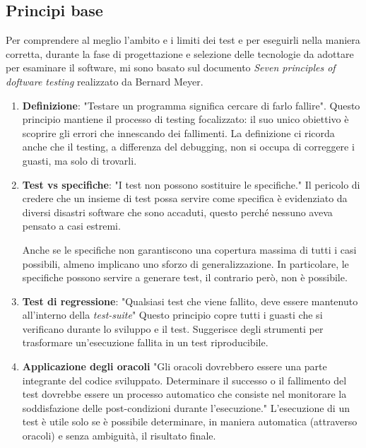\subsection{Principi base}

Per comprendere al meglio l'ambito e i limiti dei test e per eseguirli nella maniera corretta, durante la fase di progettazione e selezione delle tecnologie da adottare per esaminare il software, mi sono basato sul documento \textit{Seven principles of doftware testing} realizzato da Bernard Meyer.

\begin{enumerate}
\item \textbf{Definizione}: "Testare un programma significa cercare di farlo fallire". Questo principio mantiene il processo di testing focalizzato: il suo unico obiettivo è scoprire gli errori che innescando dei fallimenti. La definizione ci ricorda anche che il testing, a differenza del debugging, non si occupa di correggere i guasti, ma solo di trovarli.

\item \textbf{Test vs specifiche}: "I test non possono sostituire le specifiche." Il pericolo di credere che un insieme di test possa servire come specifica è evidenziato da diversi disastri software che sono accaduti, questo perché nessuno aveva pensato a casi estremi. 

Anche se le specifiche non garantiscono una copertura massima di tutti i casi possibili, almeno implicano uno sforzo di generalizzazione. In particolare, le specifiche possono servire a generare test, il contrario però, non è possibile.

\item \textbf{Test di regressione}:  "Qualsiasi test che viene fallito, deve essere mantenuto all'interno della \textit{test-suite}" Questo principio copre tutti i guasti che si verificano durante lo sviluppo e il test. Suggerisce degli strumenti per trasformare un'esecuzione fallita in un test riproducibile.

\item \textbf{Applicazione degli oracoli}  "Gli oracoli dovrebbero essere una parte integrante del codice sviluppato. Determinare il successo o il fallimento del test dovrebbe essere un processo automatico che consiste nel monitorare la soddisfazione delle post-condizioni durante l'esecuzione." L'esecuzione di un test è utile solo se è possibile determinare, in maniera automatica (attraverso oracoli) e senza ambiguità, il risultato finale.


\end{enumerate}
